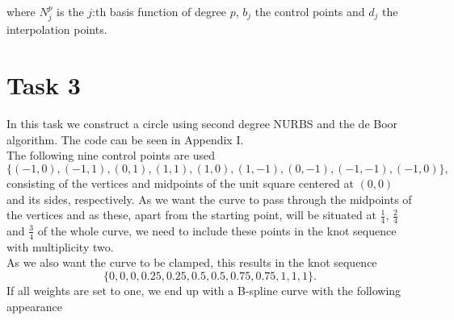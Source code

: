 \documentclass[]{article}
\begin{document}
where $N^p_j$ is the $j$:th basis function of degree $p$, $b_j$ the control points and $d_j$ the interpolation points. 

\begin{figure}[h!]
\end{figure}

\section*{Task 3}
In this task we construct a circle using second degree NURBS and the de Boor algorithm. The code can be seen in Appendix I.\\
The following nine control points are used \begin{equation*}
\{(-1, 0), (-1, 1), (0, 1), (1, 1), (1, 0), (1, -1), (0, -1), (-1, -1), (-1, 0)\},
\end{equation*}
consisting of the vertices and midpoints of the unit square centered at $(0, 0)$ and its sides, respectively. As we want the curve to pass through the midpoints of the vertices and as these, apart from the starting point, will be situated at $\frac{1}{4}$, $\frac{2}{4}$ and $\frac{3}{4}$ of the whole curve, we need to include these points in the knot sequence with multiplicity two.\\
As we also want the curve to be clamped, this results in the knot sequence \begin{equation*}
\{0, 0, 0, 0.25, 0.25, 0.5, 0.5, 0.75, 0.75, 1, 1, 1\}.
\end{equation*}
If all weights are set to one, we end up with a B-spline curve with the following appearance
\end{document}
